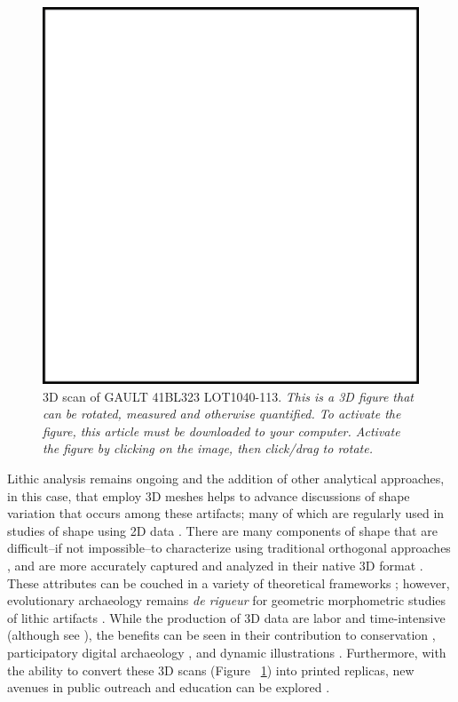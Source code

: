 \documentclass[preprint,12pt]{elsarticle}
\begin{document}
\begin{figure}[th]\centering
\includegraphics[width=\linewidth]{Fig2}
\caption{3D scan of GAULT 41BL323 LOT1040-113. \em This is a 3D figure that can be rotated, measured and otherwise quantified. To activate the figure, this article must be downloaded to your computer. Activate the figure by clicking on the image, then click/drag to rotate.}
\label{fig:Fig2}
\end{figure}

Lithic analysis remains ongoing and the addition of other analytical approaches, in this case, that employ 3D meshes helps to advance discussions of shape variation that occurs among these artifacts; many of which are regularly used in studies of shape using 2D data  \cite{RN256, RN258, RN4570, RN1812, RN4589}. There are many components of shape that are difficult--if not impossible--to characterize using traditional orthogonal approaches \cite{Shott:1, Shott:2}, and are more accurately captured and analyzed in their native 3D format \cite{RN4546, RN4561}. These attributes can be couched in a variety of theoretical frameworks \cite{Hosfield:1, Costin:1, Costin:2}; however, evolutionary archaeology remains \textit{de rigueur} for geometric morphometric studies of lithic artifacts \cite{Lycett2015}. While the production of 3D data are labor and time-intensive (although see \cite{Ahmed:1}), the benefits can be seen in their contribution to conservation \cite{Kuzminsky:1}, participatory digital archaeology \cite{Morgan:1}, and dynamic illustrations \cite{Magnani:1, Carlson:1}. Furthermore, with the ability to convert these 3D scans (Figure ~\ref{fig:Fig2}) into printed replicas, new avenues in public outreach and education can be explored \cite{Means2013}.
\end{document}
